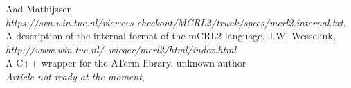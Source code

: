 \documentclass[a4paper,10pt]{article}
\theoremstyle{plain}
\theoremstyle{definition}
\begin{document}
\begin{thebibliography}{99}   Aad Mathijssen\\
   \textit{https://svn.win.tue.nl/viewcvs-checkout/MCRL2/trunk/specs/mcrl2.internal.txt},
   A description of the internal format of the mCRL2 language.
   J.W. Wesselink,
   \textit{http://www.win.tue.nl/~wieger/mcrl2/html/index.html}\\
   A C++ wrapper for the ATerm library.
    unknown author \\
   \textit{Article not ready at the moment},

\end{thebibliography}
\end{document}
